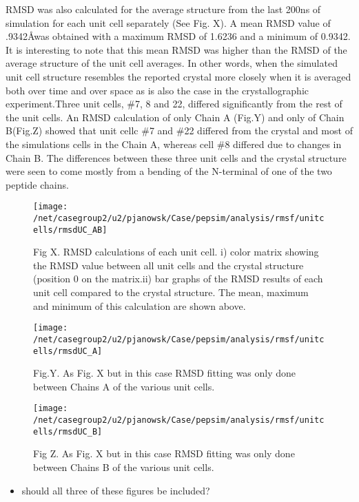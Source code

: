 \documentclass[12pt,letterpaper]{report}
\begin{document}
\begin{enumerate}
RMSD was also calculated for the average structure from the last 200ns of simulation for each unit cell separately (See Fig. X). A mean RMSD value of .9342\AA was obtained with a maximum RMSD of 1.6236 and a minimum of 0.9342. It is interesting to note that this mean RMSD was higher than the RMSD of the average structure of the unit cell averages. In other words, when the simulated unit cell structure resembles the reported crystal more closely when it is averaged both over time and over space as is also the case in the crystallographic experiment.Three unit cells, \#7, 8 and 22, differed significantly from the rest of the unit cells. An RMSD calculation of only Chain A (Fig.Y) and only of Chain B(Fig.Z) showed that unit cellc \#7 and \#22 differed from the crystal and most of the simulations cells in the Chain A, whereas cell \#8 differed due to changes in Chain B. The differences between these three unit cells and the crystal structure were seen to come mostly from a bending of the N-terminal of one of the two peptide chains.

	\begin{figure}[H]
	\centering
	\texttt{[image: /net/casegroup2/u2/pjanowsk/Case/pepsim/analysis/rmsf/unitcells/rmsdUC\_AB]}
	\caption{Fig X. RMSD calculations of each unit cell. i) color matrix showing the RMSD value between all unit cells and the crystal structure (position $0$ on the matrix.ii) bar graphs of the RMSD results of each unit cell compared to the crystal structure. The mean, maximum and minimum of this calculation are shown above.}
	\end{figure}
	\begin{figure}[H]
	\centering
	\texttt{[image: /net/casegroup2/u2/pjanowsk/Case/pepsim/analysis/rmsf/unitcells/rmsdUC\_A]}
	\caption{Fig.Y. As Fig. X but in this case RMSD fitting was only done between Chains A of the various unit cells.}
	\end{figure}
	\begin{figure}[H]
	\centering
	\texttt{[image: /net/casegroup2/u2/pjanowsk/Case/pepsim/analysis/rmsf/unitcells/rmsdUC\_B]}
	\caption{Fig Z. As Fig. X but in this case RMSD fitting was only done between Chains B of the various unit cells.}
	\end{figure}

	\begin{itemize}
	\item should all three of these figures be included?
	\end{itemize}


\end{enumerate}
\end{document}
